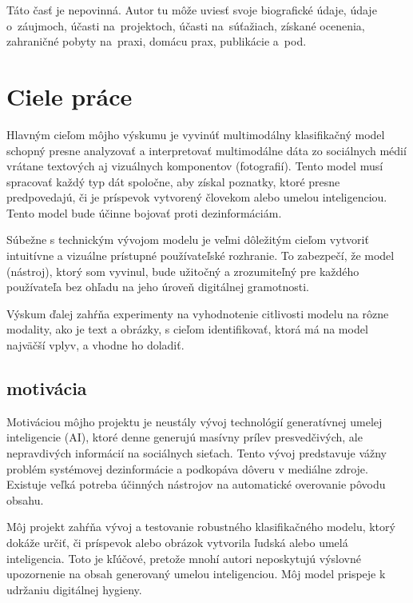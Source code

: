 \documentclass[]{tukediphc}
\begin{document}
\kslovnikterminov
%

%

%

%

%

%

%

%

%

%

%
\newpage
{}
\protect\label{page:posledna}
\curriculumvitae
Táto časť je nepovinná. Autor tu môže uviesť svoje biografické
údaje, údaje o~záujmoch, účasti na~projektoch, účasti na~súťažiach,
získané ocenenia, zahraničné pobyty na~praxi, domácu prax, publikácie
a~pod.
\kcurriculumvitae


\section{Ciele práce}
Hlavným cieľom môjho výskumu je vyvinúť multimodálny klasifikačný model schopný presne analyzovať a interpretovať multimodálne dáta zo sociálnych médií vrátane textových aj vizuálnych komponentov (fotografií). Tento model musí spracovať každý typ dát spoločne, aby získal poznatky, ktoré presne predpovedajú, či je príspevok vytvorený človekom alebo umelou inteligenciou. Tento model bude účinne bojovať proti dezinformáciám.

Súbežne s technickým vývojom modelu je veľmi dôležitým cieľom vytvoriť intuitívne a vizuálne prístupné používateľské rozhranie. To zabezpečí, že model (nástroj), ktorý som vyvinul, bude užitočný a zrozumiteľný pre každého používateľa bez ohľadu na jeho úroveň digitálnej gramotnosti.

Výskum ďalej zahŕňa experimenty na vyhodnotenie citlivosti modelu na rôzne modality, ako je text a obrázky, s cieľom identifikovať, ktorá má na model najväčší vplyv, a vhodne ho doladiť.


\subsection{motivácia}
Motiváciou môjho projektu je neustály vývoj technológií generatívnej umelej inteligencie (AI), ktoré denne generujú masívny prílev presvedčivých, ale nepravdivých informácií na sociálnych sieťach. Tento vývoj predstavuje vážny problém systémovej dezinformácie a podkopáva dôveru v mediálne zdroje. Existuje veľká potreba účinných nástrojov na automatické overovanie pôvodu obsahu.

Môj projekt zahŕňa vývoj a testovanie robustného klasifikačného modelu, ktorý dokáže určiť, či príspevok alebo obrázok vytvorila ľudská alebo umelá inteligencia. Toto je kľúčové, pretože mnohí autori neposkytujú výslovné upozornenie na obsah generovaný umelou inteligenciou. Môj model prispeje k udržaniu digitálnej hygieny.
\end{document}
